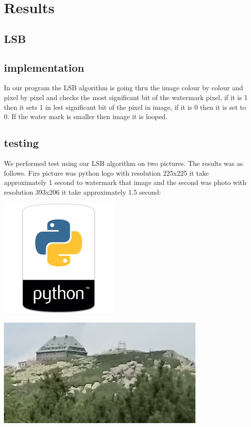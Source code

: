 \documentclass{article}
\begin{document}
	\subsection{}
\section{Results}

	\subsection{LSB}

	    \subsection{implementation}
    	In our program the LSB algorithm is going thru the image colour by colour and pixel by pixel and checks the most significant bit of the watermark pixel, if it is 1 then it sets 1 in lest significant bit of the pixel in image, if it is 0 then it is set to 0. If the water mark is smaller then image it is looped.

    	\subsection{testing}
    	We performed test using our LSB algorithm on two pictures. The results was as follows.
    	Firs picture was python logo with resolution 225x225 it take approximately 1 second to watermark that image and the second was photo with resolution 393x206 it take approximately 1.5 second:

    	\includegraphics[scale=3.0]{python_lsb/python_original.png}

    	\includegraphics[scale=0.5]{photo_lsb/Photo_original.png}
\end{document}
